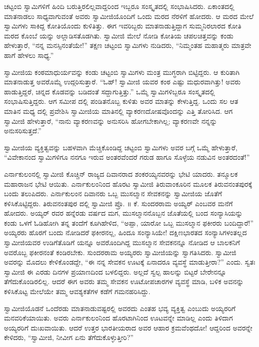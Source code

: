 ಚಟ್ಟಂಬಿ ಸ್ವಾಮಿಗಳಿಗೆ ಹಿಂದಿ ಬರುತ್ತಿರಲಿಲ್ಲವಾದ್ದರಿಂದ ಇಬ್ಬರೂ ಸಂಸ್ಕೃತದಲ್ಲಿ ಸಂಭಾಷಿಸಿದರು. ಏಕಾಂತದಲ್ಲಿ ಮಾತನಾಡಲು ಸಾಧ್ಯವಾಗುವಂತೆ ಅವರು ಸ್ವಾಮೀಜಿಯೊಂದಿಗೆ ಒಂದು ಮರದ ನೆರಳಿಗೆ ಹೋದರು. ಆ ಮರದ ಮೇಲೆ ಸ್ವಾಮಿಗಳು ಸಾಕಿದ್ದ ಕೋತಿಯೊಂದು ಕುಳಿತಿತ್ತು. ಈಗ ಇವರಿಬ್ಬರು ಮಾತನಾಡುತ್ತಿದ್ದಾಗ ಸುಮ್ಮನಿರಲಾರದ ಕೋತಿ ಮರದ ಕೊಂಬೆ ಯನ್ನು ಅಲ್ಲಾಡಿಸತೊಡಗಿತು. ಸ್ವಾಮೀಜಿ ಮೇಲೆ ನೋಡಿ ಕೋತಿಯ ಚಪಲಚಿತ್ತವನ್ನು ಕಂಡು ಹೇಳುತ್ತಾರೆ, “ನನ್ನ ಮನಸ್ಸಿನಂತೆಯೇ!” ತಕ್ಷಣ ಚಟ್ಟಂಬಿ ಸ್ವಾಮಿಗಳು ನುಡಿದರು, “ನಿಮ್ಮಂತಹ ಮಹಾತ್ಮರು ಮಾತ್ರವೇ ಹಾಗೆ ಹೇಳಲು ಸಾಧ್ಯ.”

ಸ್ವಾಮೀಜಿಯ ಕಂಠಮಾಧುರ್ಯವನ್ನು ಕಂಡು ಚಟ್ಟಂಬಿ ಸ್ವಾಮಿಗಳು ಮಂತ್ರ ಮುಗ್ಧರಾಗಿ ಬಿಟ್ಟಿದ್ದರು. ಆ ಕುರಿತಾಗಿ ಮಾತನಾಡುತ್ತ ಅವರೊಮ್ಮೆ ಉದ್ಗರಿಸುತ್ತಾರೆ. “ಓಹ್​! ಸ್ವಾಮೀಜಿ ಯವರ ಕಂಠ ಎಷ್ಟು ಮಧುರವಾಗಿತ್ತು! ಅವರು ಹಾಡುತ್ತಿದ್ದರೆ, ಚಿನ್ನದ ಕೊಡವನ್ನು ಬಡಿದಂತೆ ಸದ್ದಾಗುತ್ತಿತ್ತು.” ಒಮ್ಮೆ ಸ್ವಾಮಿಗಳಿಬ್ಬರೂ ಸಂಸ್ಕೃತದಲ್ಲಿ ಸಂಭಾಷಿಸುತ್ತಿದ್ದರು. ಆಗ ಸಮೀಪ ದಲ್ಲಿ ಪಂಡಿತನೊಬ್ಬ ಕುಳಿತು ಅವರ ಮಾತನ್ನು ಕೇಳುತ್ತಿದ್ದ. ಒಂದು ಸಲ ಆತ ಮಾತಿನ ಮಧ್ಯ ದಲ್ಲಿ ಪ್ರವೇಶಿಸಿ ಸ್ವಾಮೀಜಿಯ ಮಾತಿನಲ್ಲಿ ವ್ಯಾಕರಣದೋಷವೊಂದನ್ನು ಎತ್ತಿ ತೋರಿಸಿದ. ಆಗ ಸ್ವಾಮೀಜಿ ಹೇಳುತ್ತಾರೆ, “ನಾನು ವ್ಯಾಕರಣವನ್ನು ಅನುಸರಿಸಿ ಹೋಗಬೇಕಾಗಿಲ್ಲ; ವ್ಯಾಕರಣವೇ ನನ್ನನ್ನು ಅನುಸರಿಸುತ್ತದೆ.”

ಸ್ವಾಮೀಜಿಯ ವ್ಯಕ್ತಿತ್ವವನ್ನು ಬಹಳವಾಗಿ ಮೆಚ್ಚಿಕೊಂಡಿದ್ದ ಚಟ್ಟಂಬಿ ಸ್ವಾಮಿಗಳು ಅವರ ಬಗ್ಗೆ ಒಮ್ಮೆ ಹೇಳುತ್ತಾರೆ, “ವಿವೇಕಾನಂದ ಸ್ವಾಮಿಗಳಿಗೂ ನನಗೂ ಇರುವ ಅಂತರವೆಂದರೆ ಗರುಡ ಹಾಗೂ ಸೊಳ್ಳೆಯ ನಡುವಿನ ಅಂತರದಂತೆ!”

ಎರ್ನಾಕುಲಂನಲ್ಲಿ ಸ್ವಾಮೀಜಿ ಕೊಚ್ಚಿನ್ ರಾಜ್ಯದ ದಿವಾನರಾದ ಶಂಕರಯ್ಯನವರನ್ನು ಭೇಟಿ ಯಾದರು. ತನ್ಮೂಲಕ ಮಹಾರಾಜನ ಭೇಟಿ ಆಯಿತು. ಎರ್ನಾಕುಲಂನಿಂದ ಹೊರಟ ಸ್ವಾಮೀಜಿ ತಿರುವಾಂಕೂರಿನ ಮೂಲಕ ತಿರುವನಂತಪುರಕ್ಕೆ ಬಂದು ತಲುಪಿದರು. ಎರ್ನಾಕುಲಂನ ದಿವಾನರು ಒಬ್ಬ ಮುಸಲ್ಮಾನ ಸೇವಕನನ್ನು ಸ್ವಾಮೀಜಿಯ ಜೊತೆಗೆ ಕಳಿಸಿಕೊಟ್ಟಿದ್ದರು. ತಿರುವನಂತಪುರ ದಲ್ಲಿ ಸ್ವಾಮೀಜಿ ಪ್ರೊ. ॥ ಕೆ. ಸುಂದರರಾಮ ಅಯ್ಯರ್ ಎಂಬವರ ಮನೆಗೆ ಹೋದರು. ಅಯ್ಯರ್ ರವರ ಹನ್ನೆರಡು ವರ್ಷದ ಮಗ, ಮುಸಲ್ಮಾನನೊಬ್ಬನ ಜೊತೆಯಲ್ಲಿ ಬಂದ ಸಂನ್ಯಾಸಿಯನ್ನು ಕಂಡು ಒಳಗೆ ಓಡಿಹೋಗಿ ತನ್ನ ತಂದೆಗೆ ಕೂಗಿಹೇಳಿದ, “ಅಪ್ಪಾ, ಯಾರೋ ಒಬ್ಬ ಮುಸಲ್ಮಾನ ಫಕೀರರು ಬಂದಿದ್ದಾರೆ!” ಅಯ್ಯರರು ಹೊರಗೆ ಬಂದು ನೋಡಿದರೆ ಫಕೀರನಲ್ಲ, ಹಿಂದೂ ಸಂನ್ಯಾಸಿಯೇ! ದಕ್ಷಿಣಭಾರತದ ಸಂನ್ಯಾಸಿಗಳಂತಲ್ಲದ ಸ್ವಾಮೀಜಿಯವರ ಉಡಿಗೆತೊಡಿಗೆ ಯನ್ನೂ ಅವರೊಂದಿಗಿದ್ದ ಮುಸಲ್ಮಾನ ಸೇವಕನನ್ನೂ ನೋಡಿದ ಆ ಬಾಲಕನಿಗೆ ಅವರೊಬ್ಬ ಫಕೀರನಂತೆ ಕಂಡಿರಬೇಕು. ಸುಂದರರಾಮ ಅಯ್ಯರರು ಸ್ವಾಮೀಜಿಯನ್ನು ಸ್ವಾಗತಿಸಿದರು. ಸ್ವಾಮೀಜಿ ಅವರನ್ನು ಮೊದಲು ಕೇಳಿಕೊಂಡದ್ದೇ, “ಈ ನನ್ನ ಸೇವಕನ ಊಟಕ್ಕೆ ಏನಾದರೂ ವ್ಯವಸ್ಥೆ ಮಾಡುತ್ತೀರಾ?” ಎಂದು. ಸ್ವತಃ ಸ್ವಾಮೀಜಿ ಈ ಎರಡು ದಿನಗಳ ಪ್ರಯಾಣದಿಂದ ಬಳಲಿದ್ದರು. ಅಲ್ಲದೆ ಸ್ವಲ್ಪ ಹಾಲನ್ನು ಬಿಟ್ಟರೆ ಬೇರೇನನ್ನೂ ತೆಗೆದುಕೊಂಡಿರಲಿಲ್ಲ. ಆದರೆ ಈಗ ಅವರು ತಮ್ಮ ಸೇವಕನ ಊಟೋಪಚಾರಗಳ ವ್ಯವಸ್ಥೆ ಮಾಡಿ, ಬಳಿಕ ಅವನನ್ನು ಕಳಿಸಿಕೊಟ್ಟ ಮೇಲೆಯೇ ತಮ್ಮ ಆವಶ್ಯಕತೆಗಳ ಕಡೆಗೆ ಗಮನಹರಿಸಿದ್ದು.

ಸ್ವಾಮೀಜಿಯೊಡನೆ ಒಂದೆರಡು ಮಾತನಾಡುವಷ್ಟರಲ್ಲಿ ಅವರದು ಎಂತಹ ಭವ್ಯ ವ್ಯಕ್ತಿತ್ವ ಎಂಬುದು ಅಯ್ಯರರಿಗೆ ಮನವರಿಕೆಯಾಯಿತು. ಅವರು ಎರ್ನಾಕುಲಂನಿಂದ ಹೊರಟಾಗಿನಿಂದ ಊಟವನ್ನೇ ಮಾಡಿಲ್ಲ ಎಂದು ತಿಳಿದಾಗ ಅಯ್ಯರರಿಗೆ ದುಃಖವಾಯಿತು. ಆದರೆ ಉತ್ತರ ಭಾರತೀಯರಾದ ಅವರ ಆಹಾರ ಕ್ರಮವೆಂಥದೋ! ಆದ್ದರಿಂದ ಅವರನ್ನೇ ಕೇಳಿದರು, “ಸ್ವಾಮೀಜಿ, ನೀವೀಗ ಏನು ತೆಗೆದುಕೊಳ್ಳುತ್ತೀರಿ?”

